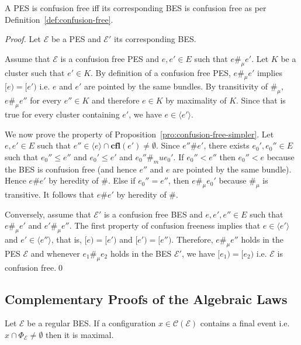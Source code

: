 \documentclass{llncs}
\newcommand{\C}{\mathcal{C}}
\newcommand{\EE}{\mathcal{E}}
\newcommand{\cfl}{\mathbf{cfl}}
\newcommand{\<}{\langle}
\renewcommand{\>}{\rangle}
\newcommand{\exit}{\Phi}
\begin{document}
\begin{proposition}
A PES is confusion free iff its corresponding BES is confusion free as per Definition~\ref{def:confusion-free}.
\end{proposition}

\begin{proof}
Let $\EE$ be a PES and $\EE'$ its corresponding BES. 

Assume that $\EE$ is a confusion free PES and $e,e'\in E$ such that $e\#_\mu e'$. Let $K$ be a cluster such that $e'\in K$. By definition of a confusion free PES, $e\#_\mu e'$ implies $[e) = [e')$ i.e. $e$ and $e'$ are pointed by the same bundles. By transitivity of $\#_\mu$, $e\#_\mu e''$ for every $e''\in K$ and therefore $e\in K$ by maximality of $K$. Since that is true for every cluster containing $e'$, we have $e\in\<e'\>$.

We now prove the property of Proposition~\ref{pro:confusion-free-simpler}. Let $e,e'\in E$ such that $e''\in\<e\>\cap\cfl(e')\neq\emptyset$. Since $e''\#e'$, there exists $e_0',e_0''\in E$ such that $e_0''\leq e''$ and $e_0'\leq e'$ and $e_0''\#_mu e_0'$. If $e_0''<e''$ then $e_0''<e$ because the BES is confusion free (and hence $e''$ and $e$ are pointed by the same bundle). Hence $e\#e'$ by heredity of $\#$. Else if $e_0'' = e''$, then $e\#_\mu e_0'$ because $\#_\mu$ is transitive. It follows that $e\#e'$ by heredity of $\#$. 

Conversely, assume that $\EE'$ is a confusion free BES and $e,e',e''\in E$ such that $e\#_\mu e'$ and $e'\#_\mu e''$. The first property of confusion freeness implies that $e\in\<e'\>$ and $e'\in\<e''\>$, that is, $[e)=[e')$ and $[e') = [e'')$. Therefore, $e\#_\mu e''$ holds in the PES $\EE$ and whenever $e_1\#_\mu e_2$ holds in the BES $\EE'$, we have $[e_1) = [e_2)$ i.e. $\EE$ is confusion free.\qed
\end{proof}

\subsection{Complementary Proofs of the Algebraic Laws}

\begin{proposition}\label{pro:exit-maximal}
Let $\EE$ be a regular BES. If a configuration $x\in\C(\EE)$ contains a final event i.e. $x\cap\exit_\EE \neq\emptyset$ then it is maximal. 
\end{proposition}
\end{document}
